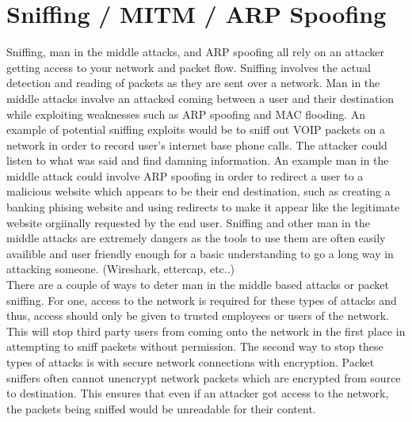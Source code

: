 \documentclass[paper=a4, fontsize=11pt]{scrartcl} %
\numberwithin{equation}{section} %
\numberwithin{figure}{section} %
\numberwithin{table}{section} %
\begin{document}
\section{Sniffing / MITM / ARP Spoofing}
Sniffing, man in the middle attacks, and ARP spoofing all rely on an attacker
getting access to your network and packet flow. Sniffing involves the actual
detection and reading of packets as they are sent over a network. Man in 
the middle attacks involve an attacked coming between a user and their 
destination while exploiting weaknesses such as ARP spoofing and
MAC flooding. An example of potential sniffing exploits would be to sniff out
VOIP packets on a network in order to record user's internet base phone calls.
The attacker could listen to what was said and find damning information. An
example man in the middle attack could involve ARP spoofing in order to
redirect a user to a malicious website which appears to be their end
destination, such as creating a banking phising website and using redirects
to make it appear like the legitimate website orgiinally requested by the end
user. Sniffing and other man in the middle attacks are extremely dangers
as the tools to use them are often easily availible and user friendly enough
for a basic understanding to go a long way in attacking someone. (Wireshark,
ettercap, etc..) \\

There are a couple of ways to deter man in the middle based attacks or
packet sniffing. For one, access to the network is required for these types
of attacks and thus, access should only be given to trusted employees or
users of the network. This will stop third party users from coming onto the 
network in the first place in attempting to sniff packets without
permission. The second way to stop these types of attacks is with secure
network connections with encryption. Packet sniffers often cannot unencrypt
network packets which are encrypted from source to destination. This ensures
that even if an attacker got access to the network, the packets being sniffed
would be unreadable for their content.


\end{document}
